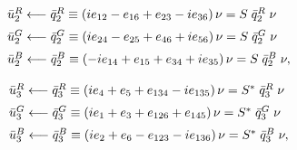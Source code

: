 \documentclass[letterpaper,12pt,titlepage,oneside,final]{book}
\newcommand{\spacer}{0.2cm}
\begin{document}
\begin{equation}\begin{array}{l}\label{newtriplet2}
\bar{u}_2^R\longleftarrow \bar{q}^R_{2}\equiv\left(ie_{12}-e_{16}+e_{23}-ie_{36}\right)\nu  =  S \hspace{1mm} \bar{q}^R_{2} \hspace{1mm}\nu  \vspace{\spacer} \\
\bar{u}_2^G\longleftarrow \bar{q}^G_{2}\equiv\left(ie_{24}-e_{25}+e_{46}+ie_{56}\right)\nu =  S \hspace{1mm} \bar{q}^G_{2} \hspace{1mm}\nu \vspace{\spacer} \\
\bar{u}_2^B\longleftarrow \bar{q}^B_{2}\equiv\left(-ie_{14}+e_{15}+e_{34}+ie_{35}\right)\nu=  S \hspace{1mm} \bar{q}^B_{2} \hspace{1mm}\nu, \vspace{\spacer} \\
\end{array}\end{equation}
\begin{equation}\begin{array}{l}\label{newtriplet3}
\bar{u}_3^R\longleftarrow \bar{q}^R_{3}\equiv\left(ie_{4}+e_{5}+e_{134}-ie_{135}\right)\nu  = S^*\hspace{1mm}\bar{q}^R_{3}\hspace{1mm}\nu  \vspace{\spacer} \\
\bar{u}_3^G\longleftarrow \bar{q}^G_{3}\equiv\left(ie_{1}+e_{3}+e_{126}+e_{145}\right)\nu= S^*\hspace{1mm}\bar{q}^G_{3}\hspace{1mm}\nu   \vspace{\spacer} \\
\bar{u}_3^B\longleftarrow \bar{q}^B_{3}\equiv\left(ie_{2}+e_{6}-e_{123}-ie_{136}\right)\nu= S^*\hspace{1mm}\bar{q}^B_{3}\hspace{1mm}\nu,   \vspace{\spacer} \\
\end{array}\end{equation}
\end{document}

